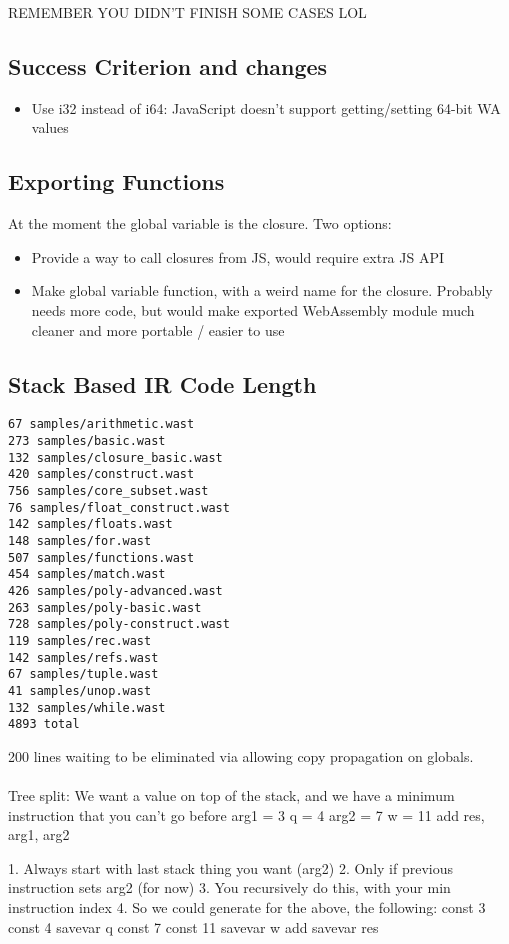 \documentclass{report}
\begin{document}
REMEMBER YOU DIDN'T FINISH SOME CASES LOL

\subsection{Success Criterion and changes}

\begin{itemize}
	\item Use i32 instead of i64: JavaScript doesn't support getting/setting 64-bit WA values
\end{itemize}

\subsection{Exporting Functions}
At the moment the global variable is the closure. Two options:
\begin{itemize}
	\item Provide a way to call closures from JS, would require extra JS API
	\item Make global variable function, with a weird name for the closure. Probably needs more code, but would make exported WebAssembly module much cleaner and more portable / easier to use
\end{itemize}

\subsection{Stack Based IR Code Length}
\begin{verbatim}
67 samples/arithmetic.wast
273 samples/basic.wast
132 samples/closure_basic.wast
420 samples/construct.wast
756 samples/core_subset.wast
76 samples/float_construct.wast
142 samples/floats.wast
148 samples/for.wast
507 samples/functions.wast
454 samples/match.wast
426 samples/poly-advanced.wast
263 samples/poly-basic.wast
728 samples/poly-construct.wast
119 samples/rec.wast
142 samples/refs.wast
67 samples/tuple.wast
41 samples/unop.wast
132 samples/while.wast
4893 total
\end{verbatim}

200 lines waiting to be eliminated via allowing copy propagation on globals.
\\\\

Tree split:
We want a value on top of the stack, and we have a minimum instruction that you can't go before
arg1 = 3
q = 4
arg2 = 7
w = 11
add res, arg1, arg2

1. Always start with last stack thing you want (arg2)
2. Only if previous instruction sets arg2 (for now)
3. You recursively do this, with your min instruction index
4. So we could generate for the above, the following:
   const 3
   const 4
   savevar q
   const 7
   const 11
   savevar w
   add
   savevar res
   
\end{document}
